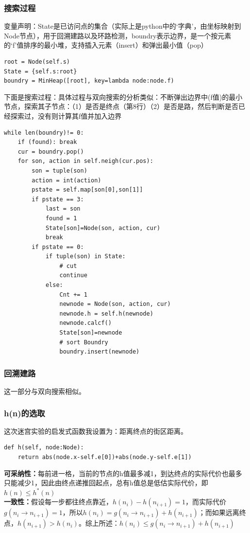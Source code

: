 \documentclass{article}
\begin{document}
\begin{CJK}{UTF8}{gbsn}
		\subsubsection{搜索过程}
		变量声明：State是已访问点的集合（实际上是python中的‘字典’，由坐标映射到Node节点），用于回溯建路以及环路检测，boundry表示边界，是一个按元素的‘f’值排序的最小堆，支持插入元素（insert）和弹出最小值（pop）
		\begin{lstlisting}
root = Node(self.s)
State = {self.s:root}
boundry = MinHeap([root], key=lambda node:node.f)
		\end{lstlisting}
		下面是搜索过程：具体过程与双向搜索的分析类似：不断弹出边界中(f值)的最小节点，探索其子节点：（1）是否是终点（第8行）（2）是否是路，然后判断是否已经探索过，没有则计算其f值并加入边界
		\begin{lstlisting}
while len(boundry)!= 0:
    if (found): break
    cur = boundry.pop()
    for son, action in self.neigh(cur.pos):
        son = tuple(son)
        action = int(action)
        pstate = self.map[son[0],son[1]]
        if pstate == 3:
            last = son
            found = 1
            State[son]=Node(son, action, cur)
            break
        if pstate == 0:
            if tuple(son) in State:
                # cut
                continue
            else:
                Cnt += 1
                newnode = Node(son, action, cur)
                newnode.h = self.h(newnode)
                newnode.calcf()
                State[son]=newnode
                # sort Boundry
                boundry.insert(newnode)
		\end{lstlisting}
		\subsubsection{回溯建路}
			这一部分与双向搜索相似。
		\subsubsection{h(n)的选取}
			这次迷宫实验的启发式函数我设置为：距离终点的街区距离。\\
			\begin{lstlisting}
def h(self, node:Node):
	return abs(node.x-self.e[0])+abs(node.y-self.e[1])
			\end{lstlisting}
			\textbf{可采纳性：}每前进一格，当前的节点的h值最多减1，到达终点的实际代价也最多只能减少1，因此由终点递推回起点，总有h值总是低估实际代价，即$h(n)\le h^*(n)$\\
			\textbf{一致性：}假设每一步都往终点靠近，$h(n_i)-h(n_{i+1})=1$，而实际代价$g(n_i\rightarrow n_{i+1})=1$，所以$h(n_i) = g(n_i\rightarrow n_{i+1})+h(n_{i+1})$；而如果远离终点，$h(n_{i+1})>h(n_i)$。综上所述：$h(n_i) \le g(n_i\rightarrow n_{i+1})+h(n_{i+1})$

\end{CJK}
\end{document}
